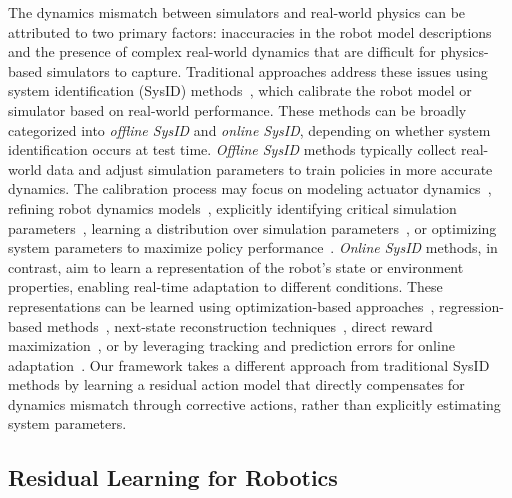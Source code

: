 The dynamics mismatch between simulators and real-world physics can be attributed to two primary factors: inaccuracies in the robot model descriptions and the presence of complex real-world dynamics that are difficult for physics-based simulators to capture. Traditional approaches address these issues using system identification (SysID) methods~\cite{kozin1986system, aastrom1971system}, which calibrate the robot model or simulator based on real-world performance. These methods can be broadly categorized into \textit{offline SysID} and \textit{online SysID}, depending on whether system identification occurs at test time. \textit{Offline SysID} methods typically collect real-world data and adjust simulation parameters to train policies in more accurate dynamics. The calibration process may focus on modeling actuator dynamics~\cite{tan2018sim, hwangbo2019learning, yang2024agile}, refining robot dynamics models~\cite{khosla1985parameter, an1985estimation, gautier2011dynamic, han2020iterative, janot2013generic}, explicitly identifying critical simulation parameters~\cite{yu2019sim, chebotar2019closing, du2021auto,wu2024loopsr}, learning a distribution over simulation parameters~\cite{ramos2019bayessim, heiden2022probabilistic, antonova2022bayesian}, or optimizing system parameters to maximize policy performance~\cite{muratore2021data, ren2023adaptsim}. \textit{Online SysID} methods, in contrast, aim to learn a representation of the robot’s state or environment properties, enabling real-time adaptation to different conditions. These representations can be learned using optimization-based approaches~\cite{yu2018policy, yu2020learning, lee2022pi, peng2020learning}, regression-based methods~\cite{yu2017preparing, kumar2021rma, wang2024cts, gu2024advancing, ji2022concurrent, margolis2023learning, fu2023deep, qi2023hand, margolis2024rapid, kumar2022adapting, miki2022learning, lee2020learning}, next-state reconstruction techniques~\cite{nahrendra2023dreamwaq, long2024hybrid, luo2024pie, wang2024toward, shirwatkar2024pip}, direct reward maximization~\cite{li2024reinforcement}, or by leveraging tracking and prediction errors for online adaptation~\cite{o2022neural, lyu2024rl2ac, huang2023datt, gao2024neural}.
Our framework takes a different approach from traditional SysID methods by learning a residual action model that directly compensates for dynamics mismatch through corrective actions, rather than explicitly estimating system parameters.

\subsection{Residual Learning for Robotics}

